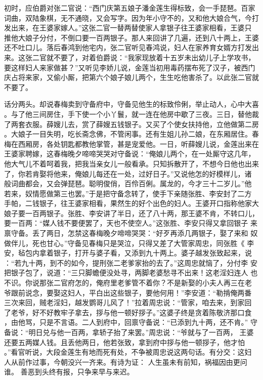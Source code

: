 初时，应伯爵对张二官说：“西门庆第五娘子潘金莲生得标致，会一手琵琶。百家
词曲，双陆象棋，无不通晓，又会写字。因为年小守不的，又和他大娘合气，今打
发出来，在王婆家嫁人。”这张二官一替两替使家人拿银子往王婆家相看，王婆只
推他大娘子分付，不倒口要一百两银子。那人来回讲了几遍，还到八十两上，王婆
还不吐口儿。落后春鸿到他宅内，张二官听见春鸿说，妇人在家养育女婿方打发出
来。这张二官就不要了，对着伯爵说：“我家现放着十五岁未出幼儿子上学攻书，
要这样妇人来家做甚？”又听见李娇儿说，金莲当初用毒药摆布死了汉子，被西门
庆占将来家，又偷小厮，把第六个娘子娘儿两个，生生吃他害杀了。以此张二官就
不要了。

话分两头。却说春梅卖到守备府中，守备见他生的标致伶俐，举止动人，心中大喜
。与了他三间房住，手下使一个小丫鬟，就一连在他房中歇了三夜。三日，替他裁
了两套衣服。薛嫂儿去，赏了薛嫂五钱银子。又买了个使女扶持他，立他做第二房
。大娘子一目失明，吃长斋念佛，不管闲事。还有生姐儿孙二娘，在东厢居住。春
梅在西厢房，各处钥匙都教他掌管，甚是宠爱他。一日，听薛嫂儿说，金莲出来在
王婆家聘嫁，这春梅晚夕啼啼哭哭对守备说：“俺娘儿两个，在一处厮守这几年，
他大气儿不着呵着我，把我当亲女儿一般看承。只知拆散开了，不想今日他也出来
了，你若肯娶将他来，俺娘儿每还在一处，过好日子。”又说他怎的好模样儿，诸
般词曲都会，又会弹琵琶。聪明俊俏，百伶百俐。属龙的，今才三十二岁儿。”他
若来，奴情愿做第三也罢。”于是把守备念转了，使手下亲随张胜、李安封了二方
手帕，二钱银子，往王婆家相看，果然生的好个出色的妇人。王婆开口指称他家大
娘子要一百两银子。张胜、李安讲了半日，还了八十两，那王婆不肯，不转口儿，
要一百两：“媒人钱不要便罢了，天也不使空人。”这张胜、李安只得又拿回银子
来禀守备。丢了两日，怎禁这春梅晚夕啼啼哭哭：“好歹再添几两银子，娶了来和
奴做伴儿，死也甘心。”守备见春梅只是哭泣，只得又差了大管家周忠，同张胜《
李安，毡包内拿着银子，打开与婆子看，又添到九十两上。婆子越发张致起来，说
：“若九十两，到不的如今，提刑张二老爹家抬的去了。”这周忠就恼了，分付李
安把银子包了，说道：“三只脚蟾便没处寻，两脚老婆愁寻不出来！这老淫妇连人
也不识。你说那张二官府怎的，俺府里老爹管不着你？不是新娶的小夫人再三在老
爷跟前说念，要娶这妇人，平白出这些银子，要他何用！”李安道：“勒掯俺两番
三次来回，贼老淫妇，越发鹦哥儿风了！”拉着周忠说：“管家，咱去来，到家回
了老爷，好不好教牢子拿去，拶与他一顿好拶子。”这婆子终是贪着陈敬济那口食
，由他骂，只是不言语。二人到府中，回禀守备说：“已添到九十两，还不肯。”
守备说：“明日兑与他一百两，拿轿子抬了来罢。”周忠说：“爷就与了一百两，
王婆还要五两媒人钱。且丢他两日，他若张致，拿到府中拶与他一顿拶子，他才怕
。”看官听说，大段金莲生有地而死有处，不争被周忠说这两句话。有分交：这妇
人从前作过事，今朝没兴一齐来。有诗为证：
人生虽未有前知，祸福因由更问谁。
善恶到头终有报，只争来早与来迟。

